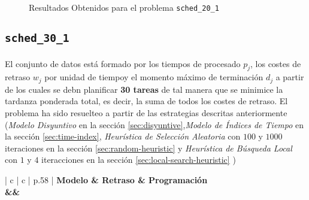 \documentclass[spanish]{article}
\begin{document}
			\begin{figure}
				\begin{center}
				\end{center}
				\caption{Resultados Obtenidos para el problema \texttt{sched\_20\_1}}
				\label{plot:sol-sched_20_1}
			\end{figure}

		\subsection{\texttt{sched\_30\_1}}

			\paragraph{}
			El conjunto de datos está formado por los tiempos de procesado $p_j$, los costes de retraso $w_j$ por unidad de tiempoy el momento máximo de terminación $d_j$ a partir de los cuales se debn planificar \textbf{30 tareas} de tal manera que se minimice la tardanza ponderada total, es decir, la suma de todos los costes de retraso. El problema ha sido resuelteo a partir de las estrategias descritas anteriormente (\emph{Modelo Disyuntivo} en la sección \ref{sec:disyuntive},\emph{Modelo de Índices de Tiempo} en la sección \ref{sec:time-index}, \emph{Heurística de Selección Aleatoria} con $100$ y $1000$ iteraciones en la sección \ref{sec:random-heuristic} y \emph{Heurística de Búsqueda Local} con $1$ y $4$ iteracciones en la sección \ref{sec:local-search-heuristic} )


			\begin{table}
				\centering
				\begin{tabu}{ | c | c | p{.58\linewidth} |}
					\hline
					\bfseries Modelo & \bfseries Retraso & \bfseries Programación
					{\\\hline\model&\delay&\schedule}
					\\\hline
				\end{tabu}
				\caption{Resultados Obtenidos para el problema \texttt{sched\_30\_1}}
				\label{table:sol-sched_30_1}
			\end{table}
\end{document}
